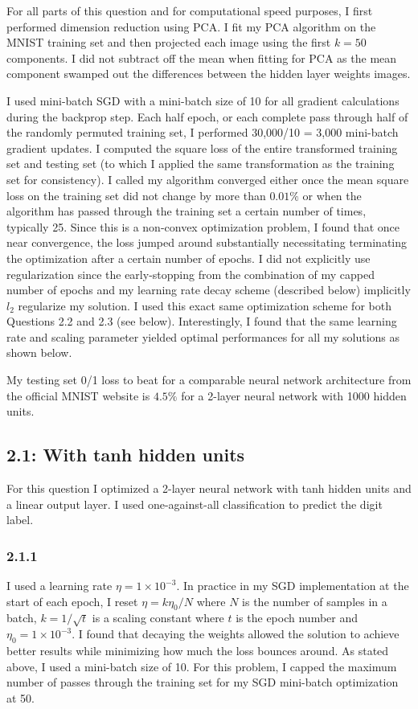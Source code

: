 \documentclass[12pt]{amsart}
\begin{document}
For all parts of this question and for computational speed purposes, I first performed dimension reduction using PCA.  I fit my PCA algorithm on the MNIST training set and then projected each image using the first $k = 50$ components.  I did not subtract off the mean when fitting for PCA as the mean component swamped out the differences between the hidden layer weights images.  

I used mini-batch SGD with a mini-batch size of 10 for all gradient calculations during the backprop step.  Each half epoch, or each complete pass through half of the randomly permuted training set, I performed 30,000/10 = 3,000 mini-batch gradient updates.  I computed the square loss of the entire transformed training set and testing set (to which I applied the same transformation as the training set for consistency).  I called my algorithm converged either once the mean square loss on the training set did not change by more than $0.01\%$ or when the algorithm has passed through the training set a certain number of times, typically 25.  Since this is a non-convex optimization problem, I found that once near convergence, the loss jumped around substantially necessitating terminating the optimization after a certain number of epochs.  I did not explicitly use regularization since the early-stopping from the combination of my capped number of epochs and my learning rate decay scheme (described below) implicitly $l_2$ regularize my solution.  I used this exact same optimization scheme for both Questions 2.2 and 2.3 (see below).  Interestingly, I found that the same learning rate and scaling parameter yielded optimal performances for all my solutions as shown below.

My testing set 0/1 loss to beat for a comparable neural network architecture from the official MNIST website is $4.5\%$ for a 2-layer neural network with 1000 hidden units.  

\subsection*{2.1: With tanh hidden units}
For this question I optimized a 2-layer neural network with tanh hidden units and a linear output layer.  I used one-against-all classification to predict the digit label.

\subsubsection*{2.1.1}
I used a learning rate $\eta = 1 \times 10^{-3}$.  In practice in my SGD implementation at the start of each epoch, I reset $\eta = k\eta_0/N$ where $N$ is the number of samples in a batch, $k = 1/\sqrt{t}$ is a scaling constant where $t$ is the epoch number and $\eta_0 = 1 \times 10^{-3}$.  I found that decaying the weights allowed the solution to achieve better results while minimizing how much the loss bounces around.   As stated above, I used a mini-batch size of 10.  For this problem, I capped the maximum number of passes through the training set for my SGD mini-batch optimization at 50.
\end{document}
